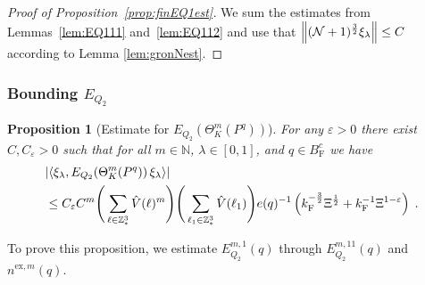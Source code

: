 \documentclass[12pt,a4paper]{article}
\numberwithin{equation}{section}
\newcommand{\NNN}{\mathbb{N}}
\newcommand{\1}{\mathbb{I}}
\newcommand{\ex}{\mathrm{ex}}
\newcommand{\F}{\mathrm{F}}
\newcommand{\Z}{\mathbb{Z}}
\newcommand{\NN}{\mathcal{N}}
\newcommand{\half}{\frac{1}{2}}
\newcommand{\eva}[1]{\left\langle #1 \right\rangle}
\theoremstyle{plain}
\newtheorem{proposition}[theorem]{Proposition}
\theoremstyle{definition}
\theoremstyle{remark}
\theoremstyle{plain}
\theoremstyle{definition}
\theoremstyle{remark}
\begin{document}
\begin{proof}[Proof of Proposition~\ref{prop:finEQ1est}]
We sum the estimates from Lemmas~\ref{lem:EQ111} and~\ref{lem:EQ112} and use that $ \norm{(\NN+1)^{\frac 32} \xi_\lambda} \le C $ according to Lemma \ref{lem:gronNest}.
\end{proof}






\subsubsection{Bounding $E_{Q_2}$}


\begin{proposition}[Estimate for $E_{Q_2}(\Theta^m_{K}(P^q))$]\label{prop:finEQ2est}
For any $ \varepsilon > 0 $ there exist $ C, C_\varepsilon > 0 $ such that for all $ m \in \NNN $, $ \lambda \in [0,1] $, and $ q \in B_{\F}^c $ we have
\begin{equation}\label{eq:finEQ2est}
\begin{split}
	& \abs{\eva{\xi_\lambda, E_{Q_2}\!\left(\Theta^m_K(P^q)\right) \xi_\lambda}} \\
	& \leq C_\varepsilon C^m \Bigg(\sum_{\ell \in \Z^3_*} \hat{V}(\ell)^m\Bigg)
		\Bigg( \sum_{\ell_1 \in \Z^3_*} \hat{V}(\ell_1) \Bigg)
		e(q)^{-1} \left( k_{\F}^{-\frac{3}{2}} \Xi^\half
		+ k_{\F}^{-1} \Xi^{1-\varepsilon} \right) \;.
\end{split}
\end{equation}
\end{proposition}

To prove this proposition, we estimate $ E^{m,1}_{Q_2}(q) $ through $ E^{m,11}_{Q_2} (q)$ and $ n^{\ex,m}(q) $.
\end{document}
